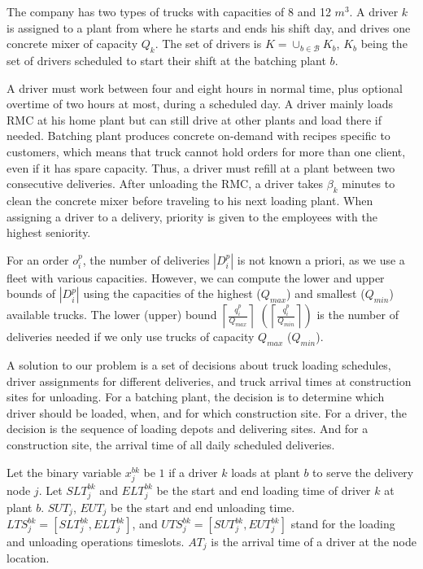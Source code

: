 \documentclass{article}
\begin{document}
{%
The company has two types of trucks with capacities of 8 and 12 $m^3$. A driver $k$ is assigned to a plant from where he starts and ends his shift day, and drives one concrete mixer of capacity $Q_k$. The set of drivers is $K=\cup_{b \in \mathcal{B}}K_b $, $K_b$ being the set of drivers scheduled to start their shift at the batching plant $b$. 

A driver must work between four and eight hours in normal time, plus optional overtime of two hours at most, during a scheduled day. A driver mainly loads RMC at his home plant but can still drive at other plants and load there if needed. Batching plant produces concrete on-demand with recipes specific to customers, which means that truck cannot hold orders for more than one client, even if it has spare capacity. Thus, a driver must refill at a plant between two consecutive deliveries. After unloading the RMC, a driver takes $\beta_k$ minutes to clean the concrete mixer before traveling to his next loading plant. When assigning a driver to a delivery, priority is given to the employees with the highest seniority.

For an order $o^p_i$, the number of deliveries $|D^p_i|$ is not known a priori, as we use a fleet with various capacities. However, we can compute the lower and upper bounds of $|D^p_i|$ using the capacities of the highest ($Q_{max}$) and smallest ($Q_{min}$) available trucks. The lower (upper) bound $\left\lceil \frac{q^p_i}{Q_{max}} \right\rceil$ $\left(\left\lceil \frac{q^p_i}{Q_{min}} \right\rceil \right)$ is the number of deliveries needed if we only use trucks of capacity $Q_{max}$ ($Q_{min}$).


A solution to our problem is a set of decisions about truck loading schedules, driver assignments for different deliveries, and truck arrival times at construction sites for unloading. For a batching plant, the decision is to determine which driver should be loaded, when, and for which construction site. For a driver, the decision is the sequence of loading depots and delivering sites. And for a construction site, the arrival time of all daily scheduled deliveries. 

Let the binary variable $x^{bk}_{j}$ be $1$ if a driver $k$ loads at plant $b$ to serve the delivery node $j$. %
Let $SLT^{bk}_{j}$ and $ELT^{bk}_{j}$ be the start and end loading time of driver $k$ at plant $b$. $SUT_{j}$, $EUT_{j}$ be the start and end unloading time. $LTS^{bk}_{j}=\left[ SLT^{bk}_{j}, ELT^{bk}_{j} \right] $, and $UTS^{bk}_{j}=\left[ SUT^{bk}_{j}, EUT^{bk}_{j} \right]$ stand for the loading  and unloading operations timeslots. $AT_{j}$ is the arrival time of a driver at the node location.

}
\end{document}

